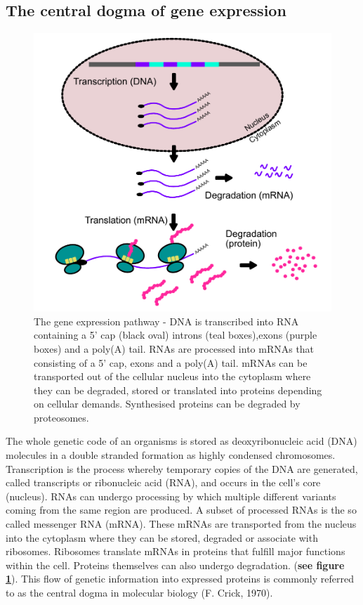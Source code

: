 \documentclass[
  12pt,
  openany]{book}
\begin{document}
\subsection{The central dogma of gene expression}
  \begin{figure}
  \includegraphics{./figures/geneExprPath_2.pdf}
  \caption{The gene expression pathway - DNA is transcribed into RNA containing a 5' cap (black oval) introns (teal boxes),exons (purple boxes) and a poly(A) tail. RNAs are processed into mRNAs that consisting of a 5' cap, exons and a poly(A) tail. mRNAs can be transported out of the cellular nucleus into the cytoplasm where they can be degraded, stored or translated into proteins depending on cellular demands. Synthesised proteins can be degraded by proteosomes. \label{fig:geneExprPath}}
\end{figure}

The whole genetic code of an organisms is stored as deoxyribonucleic acid (DNA) molecules in a double stranded formation as highly condensed chromosomes. Transcription is the process whereby temporary copies of the DNA are generated, called transcripts or ribonucleic acid (RNA), and occurs in the cell's core (nucleus). RNAs can undergo processing by which multiple different variants coming from the same region are produced. A subset of processed RNAs is the so called messenger RNA (mRNA). These mRNAs are transported from the nucleus into the cytoplasm where they can be stored, degraded or associate with ribosomes. Ribosomes translate mRNAs in proteins that fulfill major functions within the cell. Proteins themselves can also undergo degradation. (\textbf{see figure \ref{fig:geneExprPath}}). This flow of genetic information into expressed proteins is commonly referred to as the central dogma in molecular biology (F. Crick, 1970).
\clearpage
\end{document}
